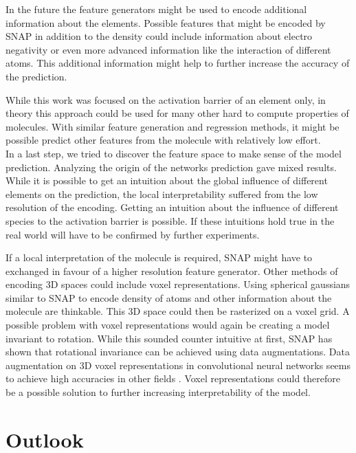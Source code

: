 In the future the feature generators might be used to encode additional information about the elements.
Possible features that might be encoded by SNAP in addition to the density could include information about 
electro negativity or even more advanced information like the interaction of different atoms.
This additional information might help to further increase the accuracy of the prediction.

While this work was focused on the activation barrier of an element only,
in theory this approach could be used for many other hard to compute properties of molecules.
With similar feature generation and regression methods, it might be possible 
predict other features from the molecule with relatively low effort.
\\

In a last step, we tried to discover the feature space to make sense of the model prediction.
Analyzing the origin of the networks prediction gave mixed results.
While it is possible to get an intuition about the global influence of different elements on
the prediction, the local interpretability suffered from the low resolution of the encoding.
Getting an intuition about the influence of different species to the activation barrier is possible.
If these intuitions hold true in the real world will have to be confirmed by further experiments.

If a local interpretation of the molecule is required, SNAP might have to exchanged in favour of a higher resolution 
feature generator.
Other methods of encoding 3D spaces could include voxel representations.
Using spherical gaussians similar to SNAP to encode density of atoms and other information about the molecule are thinkable.
This 3D space could then be rasterized on a voxel grid.
A possible problem with voxel representations would again be creating a model invariant to rotation.
While this sounded counter intuitive at first, SNAP has shown that rotational invariance can be achieved using data augmentations.
Data augmentation on 3D voxel representations in convolutional neural networks seems to achieve high accuracies in 
other fields \cite{7353481}.
Voxel representations could therefore be a possible solution to further increasing interpretability of the model.

\section{Outlook}

